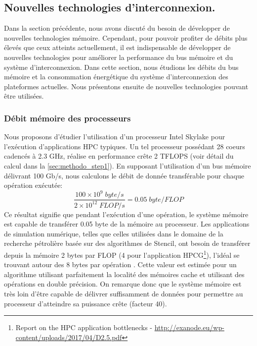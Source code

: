         



\subsection{Nouvelles technologies d'interconnexion.}

    Dans la section précédente, nous avons discuté du besoin de développer de nouvelles technologies mémoire. Cependant, pour pouvoir profiter de débits plus élevés que ceux atteints actuellement, il est indispensable de développer de nouvelles technologies pour améliorer la performance du bus mémoire et du système d'interconnexion. Dans cette section, nous étudions les débits du bus mémoire et la consommation énergétique du système d'interconnexion des plateformes actuelles. Nous présentons ensuite de nouvelles technologies pouvant être utilisées. 

    \subsubsection{Débit mémoire des processeurs} 
        
        Nous proposons d'étudier l'utilisation d'un processeur Intel Skylake pour l'exécution d'applications HPC typiques. Un tel processeur possédant 28 coeurs cadencés à 2.3 GHz, réalise en performance crête 2 TFLOPS (voir détail du calcul dans la \autoref{sec:methodo_step1}). En supposant l'utilisation d'un bus mémoire délivrant 100 Gb/s, nous calculons le débit de donnée transférable pour chaque opération exécutée:
        \begin{equation}
            \frac{100 \times 10^9 \; byte/s}{2 \times 10^{12} \; FLOP/s} = 0.05 \; byte/FLOP
        \end{equation}
        Ce résultat signifie que pendant l'exécution d'une opération, le système mémoire est capable de transférer 0.05 byte de la mémoire au processeur. Les applications de simulation numérique, telles que celles utilisées dans le domaine de la recherche pétrolière basée sur des algorithmes de Stencil, ont besoin de transférer depuis la mémoire 2 bytes par FLOP (4 pour l'application HPCG\footnote{Report on the HPC application bottlenecks - \url{http://exanode.eu/wp-content/uploads/2017/04/D2.5.pdf}}), l'idéal se trouvant autour des 8 bytes par opération \cite{Bergman2015}. Cette valeur est estimée pour un algorithme utilisant parfaitement la localité des mémoires cache et utilisant des opérations en double précision. On remarque donc que le système mémoire est très loin d'être capable de délivrer suffisamment de données pour permettre au processeur d'atteindre sa puissance crête (facteur 40). 
        
